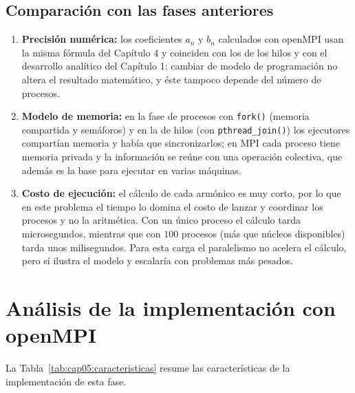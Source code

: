 \subsection{Comparación con las fases anteriores}

\begin{enumerate}
    \item \textbf{Precisión numérica:} los coeficientes $a_n$ y $b_n$ calculados con openMPI usan la misma fórmula del Capítulo 4 y coinciden con los de los hilos y con el desarrollo analítico del Capítulo 1; cambiar de modelo de programación no altera el resultado matemático, y éste tampoco depende del número de procesos.
    \item \textbf{Modelo de memoria:} en la fase de procesos con \texttt{fork()} (memoria compartida y semáforos) y en la de hilos (con \texttt{pthread\_join()}) los ejecutores compartían memoria y había que sincronizarlos; en MPI cada proceso tiene memoria privada y la información se reúne con una operación colectiva, que además es la base para ejecutar en varias máquinas.
    \item \textbf{Costo de ejecución:} el cálculo de cada armónico es muy corto, por lo que en este problema el tiempo lo domina el costo de lanzar y coordinar los procesos y no la aritmética. Con un único proceso el cálculo tarda microsegundos, mientras que con $100$ procesos (más que núcleos disponibles) tarda unos milisegundos. Para esta carga el paralelismo no acelera el cálculo, pero sí ilustra el modelo y escalaría con problemas más pesados.
\end{enumerate}

\section{Análisis de la implementación con openMPI}
\label{sec:cap05:analisis}

La Tabla~\ref{tab:cap05:caracteristicas} resume las características de la implementación de esta fase.

